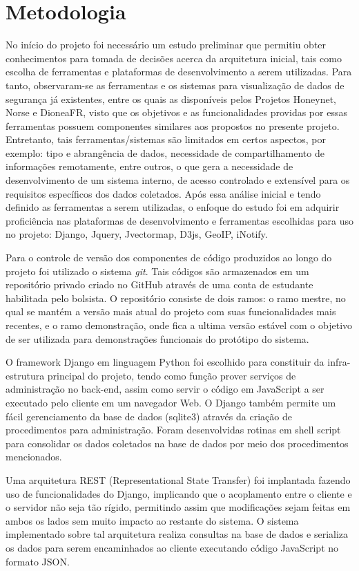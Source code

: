 \chapter{Metodologia}
No início do projeto foi necessário um estudo preliminar que permitiu obter conhecimentos para tomada de decisões acerca da arquitetura inicial, tais como escolha de ferramentas e plataformas de desenvolvimento a serem utilizadas.
Para tanto, observaram-se as ferramentas e os sistemas para visualização de dados de segurança já existentes, entre os quais as disponíveis pelos Projetos Honeynet\cite{honeynet}, Norse\cite{ipviking} e DioneaFR\cite{dioneaefr}, visto que os objetivos e as funcionalidades providas por essas ferramentas possuem componentes similares aos propostos no presente projeto. Entretanto, tais ferramentas/sistemas são limitados em certos aspectos, por exemplo: tipo e abrangência de dados, necessidade de compartilhamento de informações remotamente, entre outros, o que gera a necessidade de desenvolvimento de um sistema interno, de acesso controlado e extensível para os requisitos específicos dos dados coletados.
Após essa análise inicial e tendo definido as ferramentas a serem utilizadas, o enfoque do estudo foi em adquirir proficiência nas plataformas de desenvolvimento e ferramentas escolhidas para uso no projeto: Django, Jquery, Jvectormap, D3js, GeoIP, iNotify.

Para o controle de versão dos componentes de có́digo produzidos ao longo do projeto foi utilizado o sistema \emph{git}. Tais có́digos são armazenados em um repositó́rio privado criado no GitHub através de uma conta de estudante habilitada pelo bolsista. O repositó́rio consiste de dois ramos: o ramo mestre, no qual se mantém a versão mais atual do projeto com suas funcionalidades mais recentes, e o ramo demonstração, onde fica a ultima versão estável com o objetivo de ser utilizada para demonstrações funcionais do protótipo do sistema.

O framework Django\cite{django} em linguagem Python foi escolhido para constituir da infra-estrutura principal do projeto, tendo como função prover serviços de administração no back-end, assim como servir o có́digo em JavaScript a ser executado pelo cliente em um navegador Web. O Django também permite um fácil gerenciamento da base de dados (sqlite3) através da criação de procedimentos para administração. Foram desenvolvidas rotinas em shell script para consolidar os dados coletados na base de dados por meio dos procedimentos mencionados.

Uma arquitetura REST (Representational State Transfer) foi implantada fazendo uso de funcionalidades do Django, implicando que o acoplamento entre o cliente e o servidor não seja tão rígido, permitindo assim que modificações sejam feitas em ambos os lados sem muito impacto ao restante do sistema. O sistema implementado sobre tal arquitetura realiza consultas na base de dados e serializa os dados para serem encaminhados ao cliente executando có́digo JavaScript no formato JSON.

